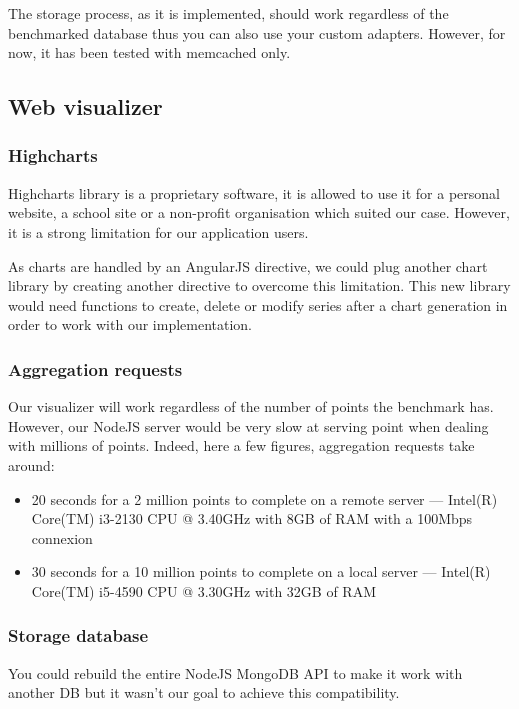 \documentclass[a4paper,11pt]{report}
\begin{document}
The storage process, as it is implemented, should work regardless of the benchmarked database thus you can also use your custom adapters.
However, for now, it has been tested with memcached only.

\subsection{Web visualizer}

\subsubsection{Highcharts}

Highcharts library is a proprietary software, it is allowed to use it for a personal website, a school site or a non-profit organisation which suited our case. However, it is a strong limitation for our application users. 

As charts are handled by an AngularJS directive, we could plug another chart library by creating another directive to overcome this limitation. This new library would need functions to create, delete or modify series after a chart generation in order to work with our implementation.

\subsubsection{Aggregation requests}

Our visualizer will work regardless of the number of points the benchmark has. However, our NodeJS server would be very slow at serving point when dealing with millions of points. Indeed, here a few figures, aggregation requests take around:
\begin{itemize}
\item
20 seconds for a 2 million points to complete on a remote server --- Intel(R) Core(TM) i3-2130 CPU @ 3.40GHz with 8GB of RAM with a 100Mbps connexion
\item
30 seconds for a 10 million points to complete on a local server --- Intel(R) Core(TM) i5-4590 CPU @ 3.30GHz with 32GB of RAM
\end{itemize}

\subsubsection{Storage database}

You could rebuild the entire NodeJS MongoDB API to make it work with another DB but it wasn't our goal to achieve this compatibility.
\end{document}
